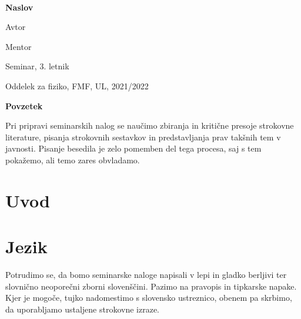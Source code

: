 \documentclass[12pt ]{article}
\begin{document}
 $~$ 
 
 \vspace{2cm}
 
 \centerline{\bf \huge   Naslov}
 
 \vspace{1cm}
 
  \centerline{\huge  Avtor}
  
   \vspace{1cm}
  
  \centerline{\large Mentor}
  
  \vspace{1cm}
  
  \centerline{\large Seminar, 3. letnik}
  
  \vspace{1cm}
  
  \centerline{\large Oddelek za fiziko, FMF, UL, 2021/2022}
  
  \vspace{6cm}
  
  \begin{minipage}[c]{0.9\hsize}
  {\bf Povzetek}
  
  Pri pripravi seminarskih nalog se nau\v cimo zbiranja in kriti\v cne presoje strokovne literature, pisanja strokovnih sestavkov in predstavljanja prav tak\v snih tem v javnosti. Pisanje besedila je zelo pomemben del tega procesa, saj s tem poka\v zemo, ali temo zares  obvladamo.    
    \end{minipage}

 
 \newpage
  
  
 \section{Uvod}
 
 \section{Jezik}
 
       Potrudimo se, da bomo seminarske naloge napisali v lepi in gladko berljivi ter slovni\v cno neopore\v cni zborni sloven\v s\v cini. Pazimo na pravopis in tipkarske napake. Kjer je mogo\v ce, tujko nadomestimo s slovensko ustreznico, obenem pa skrbimo, da uporabljamo ustaljene strokovne izraze.    
    
\end{document}
